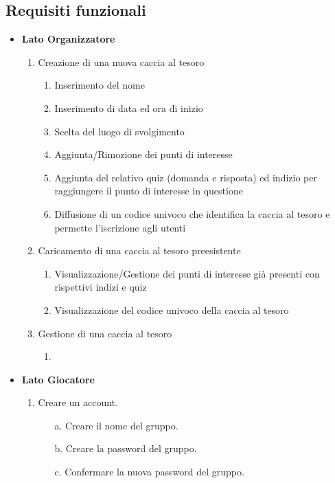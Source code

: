 \documentclass[12pt, italian]{article}
\begin{document}
\subsection{Requisiti funzionali}
\begin{itemize}
	\item \textbf{Lato Organizzatore} 
	\begin{enumerate}
		\item Creazione di una nuova caccia al tesoro
			\begin{enumerate}[label=(\alph*)]
				\item Inserimento del nome
				\item Inserimento di data ed ora di inizio
				\item Scelta del luogo di svolgimento
				\item Aggiunta/Rimozione dei punti di interesse 
				\item Aggiunta del relativo quiz (domanda e risposta) ed indizio per raggiungere il punto di interesse in questione
				\item Diffusione di un codice univoco che identifica la caccia al tesoro e permette l'iscrizione agli utenti
			\end{enumerate}
		\item Caricamento di una caccia al tesoro preesistente
		\begin{enumerate}[label=(\alph*)]
			\item Visualizzazione/Gestione dei punti di interesse già presenti con rispettivi indizi e quiz
			\item Visualizzazione del codice univoco della caccia al tesoro
		\end{enumerate}
	\item Gestione di una caccia al tesoro
		\begin{enumerate}[label=(\alph*)]
			\item 
		\end{enumerate}
	\end{enumerate}
	\item \textbf{Lato Giocatore}
		\begin{enumerate}
			\item Creare un account.
			\begin{enumerate}
				\item [a.] Creare il nome del gruppo.
				\item [b.] Creare la password del gruppo.
				\item [c.] Confermare la nuova password del gruppo.

\end{enumerate}
\end{enumerate}
\end{itemize}
\end{document}
